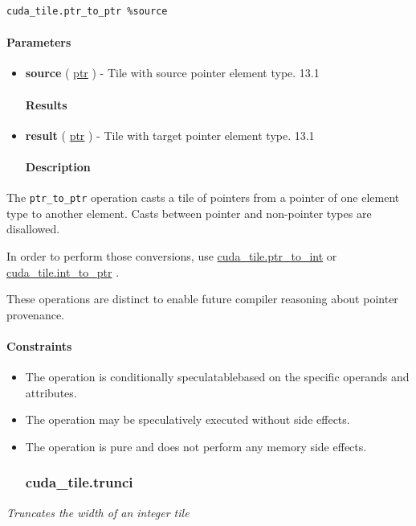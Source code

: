 \documentclass{article}
\begin{document}
\begin{lstlisting}
cuda_tile.ptr_to_ptr %source
\end{lstlisting}

\paragraph{Parameters}

\begin{itemize}
\item \textbf{source} ( \href{https://docs.nvidia.com/cuda/tile-ir/latest/sections/types.html#type-ptr}{ptr} ) - Tile with source pointer element type. 13.1


\paragraph{Results}

\item \textbf{result} ( \href{https://docs.nvidia.com/cuda/tile-ir/latest/sections/types.html#type-ptr}{ptr} ) - Tile with target pointer element type. 13.1


\paragraph{Description}

\end{itemize}
The \texttt{ptr\_to\_ptr} operation casts a tile of pointers from a pointer of one element type to another element. Casts between pointer and non-pointer types are disallowed.


In order to perform those conversions, use \href{https://docs.nvidia.com/cuda/tile-ir/latest/sections/operations.html#op-cuda-tile-ptr-to-int}{cuda\_tile.ptr\_to\_int} or \href{https://docs.nvidia.com/cuda/tile-ir/latest/sections/operations.html#op-cuda-tile-int-to-ptr}{cuda\_tile.int\_to\_ptr} .

These operations are distinct to enable future compiler reasoning about pointer provenance.



\paragraph{Constraints}

\begin{itemize}
\item The operation is conditionally speculatablebased on the specific operands and attributes.
\item The operation may be speculatively executed without side effects.
\item The operation is pure and does not perform any memory side effects.


\subsubsection{cuda\_tile.trunci}

\end{itemize}
\textit{Truncates the width of an integer tile}
\end{document}
